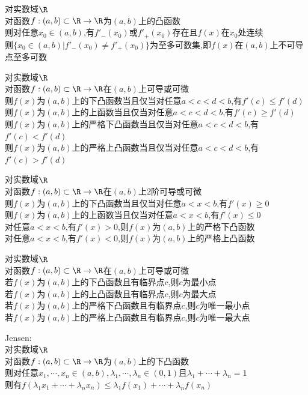 \begin{dingli}
对实数域$\R$\\
对函数$f:(a,b)\subset \R \to \R$为$(a,b)$上的凸函数\\
则对任意$x_0\in(a,b)$,有$f'_{-}(x_0)$或$f'_{+}(x_0)$存在且$f(x)$在$x_0$处连续\\
则$\{x_0\in(a,b)|f'_{-}(x_0)\neq f'_{+}(x_0)\}$为至多可数集,即$f(x)$在$(a,b)$上不可导点至多可数
\end{dingli}

\begin{dingli}
对实数域$\R$\\
对函数$f:(a,b)\subset \R \to \R$在$(a,b)$上可导或可微\\
则$f(x)$为$(a,b)$上的下凸函数当且仅当对任意$a<c<d<b$,有$f'(c)\leq f'(d)$\\
则$f(x)$为$(a,b)$上的上函数当且仅当对任意$a<c<d<b$,有$f'(c)\geq f'(d)$\\
则$f(x)$为$(a,b)$上的严格下凸函数当且仅当对任意$a<c<d<b$,有$f'(c)< f'(d)$\\
则$f(x)$为$(a,b)$上的严格上凸函数当且仅当对任意$a<c<d<b$,有$f'(c)> f'(d)$
\end{dingli}

\begin{dingli}
对实数域$\R$\\
对函数$f:(a,b)\subset \R \to \R$在$(a,b)$上$2$阶可导或可微\\
则$f(x)$为$(a,b)$上的下凸函数当且仅当对任意$a<x<b$,有$f'(x)\geq 0$\\
则$f(x)$为$(a,b)$上的上函数当且仅当对任意$a<x<b$,有$f'(x)\leq 0$\\
对任意$a<x<b$,有$f'(x)> 0$,则$f(x)$为$(a,b)$上的严格下凸函数\\
对任意$a<x<b$,有$f'(x)< 0$,则$f(x)$为$(a,b)$上的严格上凸函数
\end{dingli}

\begin{dingli}
对实数域$\R$\\
对函数$f:(a,b)\subset \R \to \R$在$(a,b)$上可导或可微\\
若$f(x)$为$(a,b)$上的下凸函数且有临界点$c$,则$c$为最小点\\
若$f(x)$为$(a,b)$上的上凸函数且有临界点$c$,则$c$为最大点\\
若$f(x)$为$(a,b)$上的严格下凸函数且有临界点$c$,则$c$为唯一最小点\\
若$f(x)$为$(a,b)$上的严格上凸函数且有临界点$c$,则$c$为唯一最大点
\end{dingli}

\begin{dingli}
Jensen:\\
对实数域$\R$\\
对函数$f:(a,b)\subset \R \to \R$为$(a,b)$上的下凸函数\\
则对任意$x_1,\cdots,x_n\in(a,b),\lambda_1,\cdots,\lambda_n\in(0,1)$且$\lambda_1+\cdots+\lambda_n=1$\\
则有$f(\lambda_1x_1+\cdots+\lambda_n x_n)\leq \lambda_1f(x_1)+\cdots+\lambda_nf(x_n)$
\end{dingli}

